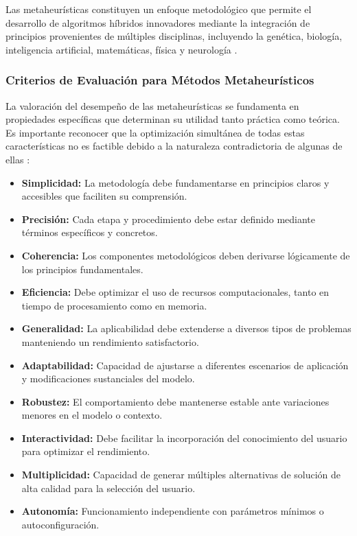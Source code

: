 \documentclass[12pt,titlepage,twoside,openright]{book}
\begin{document}
Las metaheurísticas constituyen un enfoque metodológico que permite el desarrollo de algoritmos híbridos innovadores mediante la integración de principios provenientes de múltiples disciplinas, incluyendo la genética, biología, inteligencia artificial, matemáticas, física y neurología \citep{antonioSuarez2014}.

\subsubsection{Criterios de Evaluación para Métodos Metaheurísticos}

La valoración del desempeño de las metaheurísticas se fundamenta en propiedades específicas que determinan su utilidad tanto práctica como teórica. Es importante reconocer que la optimización simultánea de todas estas características no es factible debido a la naturaleza contradictoria de algunas de ellas \citep{antonioSuarez2014}:

\begin{itemize}
	\item \textbf{Simplicidad:} La metodología debe fundamentarse en principios claros y accesibles que faciliten su comprensión.
	\item \textbf{Precisión:} Cada etapa y procedimiento debe estar definido mediante términos específicos y concretos.
	\item \textbf{Coherencia:} Los componentes metodológicos deben derivarse lógicamente de los principios fundamentales.
	\item \textbf{Eficiencia:} Debe optimizar el uso de recursos computacionales, tanto en tiempo de procesamiento como en memoria.
	\item \textbf{Generalidad:} La aplicabilidad debe extenderse a diversos tipos de problemas manteniendo un rendimiento satisfactorio.
	\item \textbf{Adaptabilidad:} Capacidad de ajustarse a diferentes escenarios de aplicación y modificaciones sustanciales del modelo.
	\item \textbf{Robustez:} El comportamiento debe mantenerse estable ante variaciones menores en el modelo o contexto.
	\item \textbf{Interactividad:} Debe facilitar la incorporación del conocimiento del usuario para optimizar el rendimiento.
	\item \textbf{Multiplicidad:} Capacidad de generar múltiples alternativas de solución de alta calidad para la selección del usuario.
	\item \textbf{Autonomía:} Funcionamiento independiente con parámetros mínimos o autoconfiguración.
\end{itemize}
\end{document}
